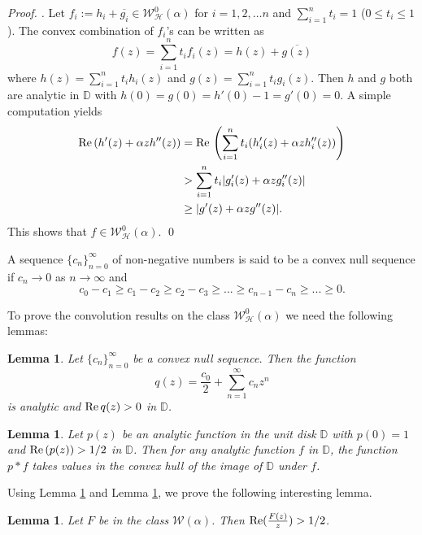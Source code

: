 \documentclass[a4paper,12pt]{amsart}
\theoremstyle{plain}
\newtheorem{lem}[equation]{Lemma}
\theoremstyle{definition}
\newenvironment{pf}[1][]{ \vskip 3mm
 \noindent
 \ifthenelse{\equal{#1}{}}  {{\slshape Proof. }}  {{\slshape #1.} } }{\qed\bigskip}
\begin{document}
\begin{pf}
Let $f_i:=h_i + \overline{g_i}\in \mathcal{W}^0_{\mathcal{H}}(\alpha)$ for $i = 1,2,\ldots n$ and  $\sum _{i = 1}^{n} t_i = 1$ ($0\leq t_i\leq1$).
The convex combination of $f_i$'s can  be written as
$$
f(z) = \sum_{i =1}^{n} t_i f_i(z) = h(z) + \overline{g(z)}
$$
where $h(z) = \sum_{i =1}^{n} t_i h_i(z)$ and $g(z) = \sum_{i =1}^{n} t_i g_i(z)$. Then $h$ and $g$ both are analytic in $\mathbb{D}$ with $h(0) = g(0)= h'(0)-1 = g'(0) =0$. A simple computation yields
\begin{align*}
{\rm Re\,}(h'(z) + \alpha z h''(z)) &= {\rm Re\,}\left(\sum_{i = 1}^{n} t_i  (h'_i(z) + \alpha z h''_i(z))\right)\\
& > \sum_{i = 1}^{n} t_i |g'_i(z) + \alpha z g''_i(z)|\\
& \geq |g'(z) + \alpha z g''(z)|.
\end{align*}
This shows that $f\in\mathcal{W}^0_{\mathcal{H}}(\alpha)$.
\end{pf}

A sequence $\{c_n\}_{n=0}^{\infty}$ of  non-negative numbers is said to be a convex null sequence if $c_n \rightarrow {0}$ as $n \rightarrow \infty$  and
$$
c_0 - c_1 \geq c_1 - c_2 \geq c_2 - c_3 \geq ...\geq c_{n-1} - c_n \geq ...\geq 0.
$$

\noindent To prove the convolution results on the class $\mathcal{W}^0_{\mathcal{H}}(\alpha)$ we need the following lemmas:
\begin{lem}\label{niru-p2-l005}\cite{Singh-Singh-1989}
Let $\{c_n\}_{n=0}^{\infty}$ be a convex null sequence. Then the function
$$
q(z) = \frac{c_0}{2} + \sum_{n =1}^{\infty}c_n z^n
$$
is analytic and ${\rm Re\,}q(z)> 0$ in $\mathbb{D}$.
\end{lem}

\begin{lem}\label{niru-p2-l010}\cite{Singh-Singh-1989}
Let $p(z)$ be an analytic function in the unit disk $\mathbb{D}$ with $p(0) = 1 $ and ${\rm Re\,}(p(z))> 1/2$ in $\mathbb{D}$. Then for any analytic function $f$ in $\mathbb{D}$, the function $p * f$ takes values in the convex hull of the image of $\mathbb{D}$ under $f$.
\end{lem}

\noindent Using Lemma \ref{niru-p2-l005} and Lemma \ref{niru-p2-l010}, we  prove the following interesting lemma.

\begin{lem}\label{niru-p2-l015}
Let $F$ be in the class $\mathcal{W}(\alpha)$. Then ${\rm Re}(\frac{F(z)}{z})> 1/2$.
\end{lem}
\end{document}
